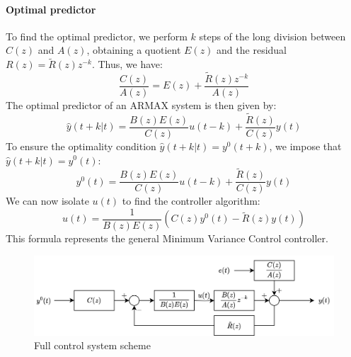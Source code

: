 \paragraph*{Optimal predictor}
To find the optimal predictor, we perform $k$ steps of the long division between $C(z)$ and $A(z)$, obtaining a quotient $E(z)$ and the residual $R(z)=\tilde{R}(z)z^{-k}$. 
Thus, we have:
\[\dfrac{C(z)}{A(z)}=E(z)+\dfrac{\tilde{R}(z)z^{-k}}{A(z)}\]
The optimal predictor of an ARMAX system is then given by:
\[\hat{y}(t+k|t)=\dfrac{B(z)E(z)}{C(z)}u(t-k)+\dfrac{\tilde{R}(z)}{C(z)}y(t)\]
To ensure the optimality condition $\hat{y}(t+k|t)=y^{0}(t+k)$, we impose that $\hat{y}(t+k|t)=y^{0}(t)$: 
\[y^{0}(t)=\dfrac{B(z)E(z)}{C(z)}u(t-k)+\dfrac{\tilde{R}(z)}{C(z)}y(t)\]
We can now isolate $u(t)$ to find the controller algorithm: 
\[u(t)=\dfrac{1}{B(z)E(z)}\left(C(z)y^{0}(t)-\tilde{R}(z)y(t)\right)\]
This formula represents the general Minimum Variance Control controller.
\begin{figure}[H]
    \centering
    \includegraphics[width=0.75\linewidth]{images/fcss.png}
    \caption{Full control system scheme}
\end{figure}